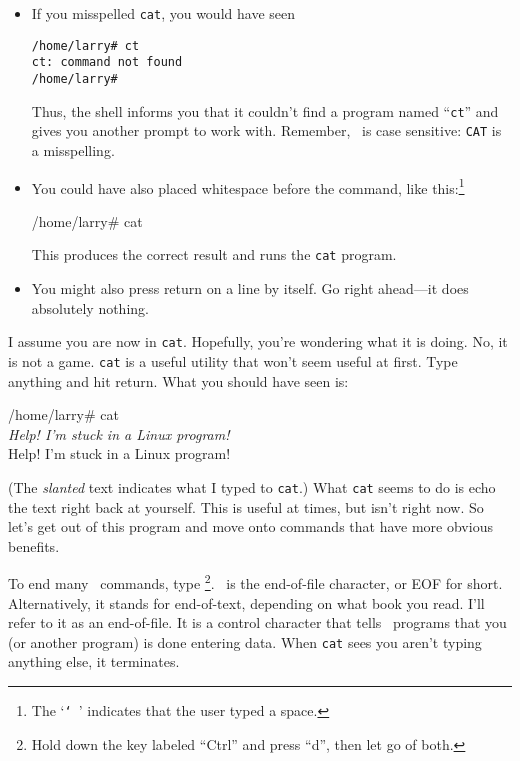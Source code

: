 \begin{itemize}
\item If you misspelled {\tt cat}, you would have seen
\begin{screen}\begin{verbatim}
/home/larry# ct
ct: command not found
/home/larry#
\end{verbatim}\end{screen}
Thus, the shell informs you that it couldn't find a program named
``{\tt ct}'' and gives you another prompt to work with. Remember,
\unix\ is case sensitive: {\tt CAT} is a misspelling.
\item You could have also placed whitespace before the command, like
  this:\footnote{The `{\tt \char `\ }' indicates that the user typed a
    space.}
\begin{screen}\begin{verbatim*}
/home/larry#     cat     
\end{verbatim*}\end{screen}
This produces the correct result and runs the {\tt cat} program.
\item You might also press return on a line by itself. Go right
  ahead---it does absolutely nothing.
\end{itemize}

I assume you are now in {\tt cat}.  Hopefully, you're
wondering what it is doing.  No, it is not a game.  {\tt cat} is a
useful utility that won't seem useful at first.  Type anything and
hit return.  What you should have seen is:

\begin{tscreen}
/home/larry\# cat\\
{\sl Help! I'm stuck in a Linux program!}\\
Help! I'm stuck in a Linux program!
\end{tscreen}

(The {\sl slanted\/} text indicates what I typed to {\tt cat}.) What
{\tt cat} seems to do is echo the text right back at yourself.  This
is useful at times, but isn't right now.  So let's get out of this
program and move onto commands that have more obvious benefits.

To end many \unix\ commands, type \eof\footnote{Hold down the key
  labeled ``Ctrl'' and press ``d'', then let go of both.}. \eof\ is
the end-of-file character, or EOF for short.
 Alternatively, it stands for end-of-text,
depending on what book you read.  I'll refer to it as an end-of-file.
It is a control character that tells \unix\ programs that you (or
another program) is done entering data.  When {\tt cat} sees you
aren't typing anything else, it terminates.

